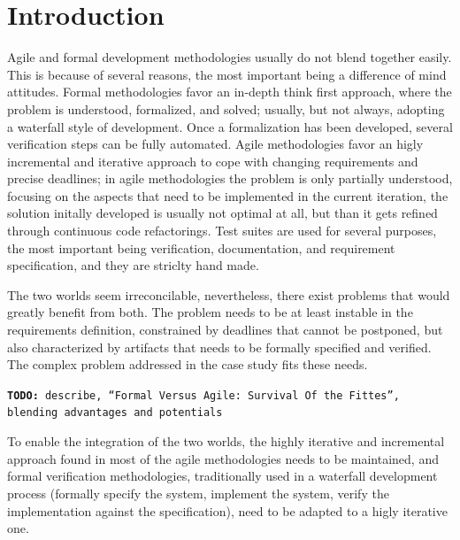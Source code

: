 \documentclass{article} \usepackage{times}
\newcommand{\todo}[1]{\texttt{\textbf{TODO:} #1}}
\begin{document}
\section{Introduction}
\label{sec:introduction}

Agile and formal development methodologies usually do not blend together easily.
This is because of several reasons, the most important being a difference of mind attitudes.
Formal methodologies favor an in-depth think first approach, where the problem is understood, formalized, and solved; usually, but not always, adopting a waterfall style of development.
Once a formalization has been developed, several verification steps can be fully automated.
Agile methodologies favor an higly incremental and iterative approach to cope with changing requirements and precise deadlines; in agile methodologies the problem is only partially understood, focusing on the aspects that need to be implemented in the current iteration, the solution initally developed is usually not optimal at all, but than it gets refined through continuous code refactorings.
Test suites are used for several purposes, the most important being verification, documentation, and requirement specification, and they are striclty hand made.

The two worlds seem irreconcilable, nevertheless, there exist problems that would greatly benefit from both.
The problem needs to be at least instable in the requirements definition, constrained by deadlines that cannot be postponed, but also characterized by artifacts that needs to be formally specified and verified.
The complex problem addressed in the case study fits these needs.

\todo{describe, ``Formal Versus Agile: Survival Of the Fittes'', blending advantages and potentials}

To enable the integration of the two worlds, the highly iterative and incremental approach found in most of the agile methodologies needs to be maintained, and formal verification  methodologies, traditionally used in a waterfall development process (formally specify the system, implement the system, verify the implementation against the specification), need to be adapted to a higly iterative one.
\end{document}
